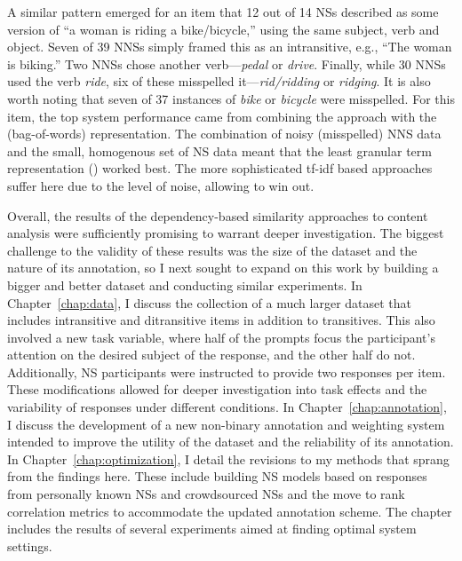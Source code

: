 A similar pattern emerged for an item that 12 out of 14 NSs described as some version of ``a woman is riding a bike/bicycle,'' using the same subject, verb and object. Seven of 39 NNSs  simply framed this as an intransitive, e.g., ``The woman is biking.'' Two NNSs chose another verb---\textit{pedal} or \textit{drive}. Finally, while 30 NNSs used the verb \textit{ride}, six of these misspelled it---\textit{rid/ridding} or \textit{ridging}. It is also worth noting that seven of 37 instances of \textit{bike} or \textit{bicycle} were misspelled. For this item, the top system performance came from combining the  approach with the  (bag-of-words) representation. The combination of noisy (misspelled) NNS data and the small, homogenous set of NS data meant that the least granular term representation () worked best. The more sophisticated tf-idf based approaches suffer here due to the level of noise, allowing  to win out.

Overall, the results of the dependency-based similarity approaches to content analysis were sufficiently promising to warrant deeper investigation. The biggest challenge to the validity of these results was the size of the dataset and the nature of its annotation, so I next sought to expand on this work by building a bigger and better dataset and conducting similar experiments. In Chapter~\ref{chap:data}, I discuss the collection of a much larger dataset that includes intransitive and ditransitive items in addition to transitives. This also involved a new task variable, where half of the prompts focus the participant's attention on the desired subject of the response, and the other half do not. Additionally, NS participants were instructed to provide two responses per item. These modifications allowed for deeper investigation into task effects and the variability of responses under different conditions. In Chapter~\ref{chap:annotation}, I discuss the development of a new non-binary annotation and weighting system intended to improve the utility of the dataset and the reliability of its annotation. In Chapter~\ref{chap:optimization}, I detail the revisions to my methods that sprang from the findings here. These include building NS models based on responses from personally known  NSs and crowdsourced NSs and the move to rank correlation metrics to accommodate the updated annotation scheme. The chapter includes the results of several experiments aimed at finding optimal system settings.

